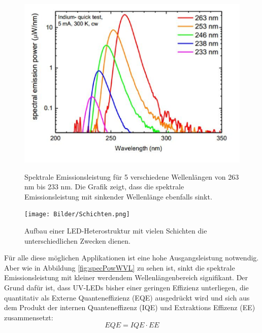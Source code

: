 %
\begin{figure}[htb]
    \centering
    \begin{minipage}[t]{0.49\linewidth}
        \centering
        \includegraphics[width=\linewidth]{Bilder/SpectralEmissionPower_Wavelength.png}
        \caption{Spektrale Emissionsleistung für 5 verschiedene Wellenlängen von 263 nm bis 233 nm. Die Grafik zeigt, dass die spektrale Emissionsleistung mit sinkender Wellenlänge ebenfalls sinkt\cite{semreich}.}
        \label{fig:specPowWVL}
    \end{minipage}
    \hfill
    \begin{minipage}[t]{0.49\linewidth}
        \centering
        \texttt{[image: Bilder/Schichten.png]}
        \caption{Aufbau einer LED-Heterostruktur mit vielen Schichten die unterschiedlichen Zwecken dienen.}
        \label{fig:schichtenLED}
    \end{minipage}
\end{figure}
\noindent
%
Für alle diese möglichen Applikationen ist eine hohe Ausgangsleistung notwendig. Aber wie in Abbildung \ref{fig:specPowWVL} zu sehen ist, sinkt die spektrale Emissionsleistung mit kleiner werdendem Wellenlängenbereich signifikant. Der Grund dafür ist, dass UV-LEDs bisher einer geringen Effizienz unterliegen, die quantitativ als Externe Quanteneffizienz (EQE) ausgedrückt wird und sich aus dem Produkt der internen Quanteneffizenz (IQE) und Extraktions Effizenz (EE) zusammensetzt:
%
\begin{equation}
    EQE = IQE \cdot EE 
\end{equation}
%
